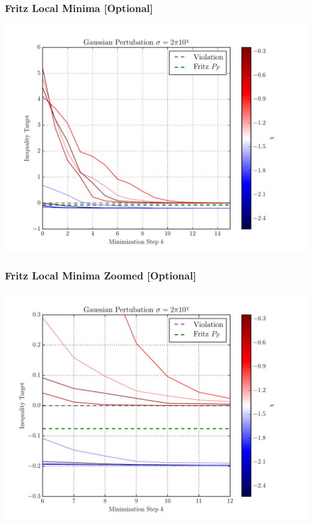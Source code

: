 \documentclass[
    hyperref={bookmarks=false},%
    xcolor={dvipsnames},
]{beamer}
\begin{document}
\begin{frame}
    \frametitle{Fritz Local Minima [Optional]}
    \includegraphics[width=\linewidth]{../../figures/optimizations/Gaussian_Perturbation_Fritz_Color_Default.pdf}
\end{frame}

\begin{frame}
    \frametitle{Fritz Local Minima Zoomed [Optional]}
    \includegraphics[width=\linewidth]{../../figures/optimizations/Gaussian_Perturbation_Fritz_Color_Zoomed.pdf}
\end{frame}
\end{document}
